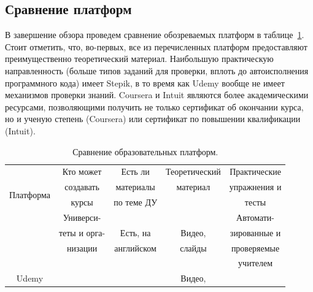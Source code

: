 \documentclass[14pt,russian]{extarticle}
\begin{document}
\subsection{Сравнение платформ}
В завершение обзора проведем сравнение обозреваемых платформ в таблице~\ref{table:platform_comparison}. Стоит отметить, что, во-первых, все из перечисленных платформ предоставляют преимущественно теоретический материал. Наибольшую практическую направленность (больше типов заданий для проверки, вплоть до автоисполнения программного кода) имеет Stepik, в то время как Udemy вообще не имеет механизмов проверки знаний. Coursera и Intuit являются более академическими ресурсами, позволяющими получить не только сертификат об окончании курса, но и ученую степень (Coursera) или сертификат по повышении квалификации (Intuit).


\begin{table}[H]
\caption{Сравнение образовательных платформ.\label{table:platform_comparison}}
\begin{center}
\begin{tabular}{|c|c|c|c|c|}
\hline 
\multirow{4}{*}{Платформа}&Кто может            & Есть ли                    &    Теоретический  &   Практические \\
                                                 &создавать            & материалы              &  материал              &   упражнения     и       \\
                                                 &курсы                   & по теме ДУ              &                                 &   тесты  \\
\hline
\multirow{3}{*}{Coursera} & Универси-               &                                  &                                & Автомати-\\
                                            & теты и орга-            &Есть,      на               & Видео,                    & зированные и \\
                                            &        низации            & английском             &  слайды                   & проверяемые  \\
                                            &                                   &                                   &                                & учителем  \\                            
\hline
\multirow{4}{*}{Udemy}    &                            &                                        & Видео,                    & \\

\end{tabular}
\end{center}
\end{table}
\end{document}
